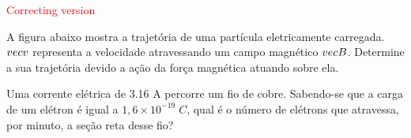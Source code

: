 \documentclass[12pt, addpoints]{exam}
\begin{document}
        \begin{center}
\textcolor{red}{\emph\Large Correcting version}\end{center}
\begin{questions}
\begin{multicols*}{2}
\question[20] A ﬁgura abaixo mostra a trajetória de uma partícula eletricamente carregada. $\\vec{{v}}$ representa a velocidade atravessando um campo magnético $\\vec{{B}}$. Determine a sua trajetória devido a ação da força magnética atuando sobre ela.
        
        \begin{center}
            \begin{minipage}[c]{0.5\linewidth}
            \end{minipage}
        \end{center}

        

\begin{oneparchoices}
\end{oneparchoices}
\question[20] Uma corrente elétrica de    3.16 A percorre um ﬁo de cobre. Sabendo-se que a carga de um elétron é igual a $1,6\times 10^{-19}\;C$, qual é o número de elétrons que atravessa, por minuto, a seção reta desse ﬁo?


\end{multicols*}
\end{questions}
\end{document}
